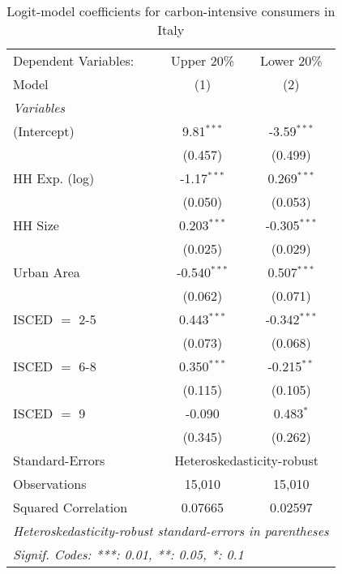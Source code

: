 
\begin{table}[htbp!]
   \centering
   \small
   \begin{adjustbox}{width = 1\textwidth, max height = 0.95\textheight, center}
      \begin{threeparttable}[b]
         \caption{\label{tab:Logit_1_ITA} Logit-model coefficients for carbon-intensive consumers in Italy}
         \begin{tabular}{lcc}
            \tabularnewline \midrule \midrule
            Dependent Variables: & Upper 20\%     & Lower 20\%\\   
            Model                & (1)            & (2)\\  
            \midrule
            \emph{Variables}\\
            (Intercept)          & 9.81$^{***}$   & -3.59$^{***}$\\   
                                 & (0.457)        & (0.499)\\   
            HH Exp. (log)        & -1.17$^{***}$  & 0.269$^{***}$\\   
                                 & (0.050)        & (0.053)\\   
            HH Size              & 0.203$^{***}$  & -0.305$^{***}$\\   
                                 & (0.025)        & (0.029)\\   
            Urban Area           & -0.540$^{***}$ & 0.507$^{***}$\\   
                                 & (0.062)        & (0.071)\\   
            ISCED $=$ 2-5        & 0.443$^{***}$  & -0.342$^{***}$\\   
                                 & (0.073)        & (0.068)\\   
            ISCED $=$ 6-8        & 0.350$^{***}$  & -0.215$^{**}$\\   
                                 & (0.115)        & (0.105)\\   
            ISCED $=$ 9          & -0.090         & 0.483$^{*}$\\   
                                 & (0.345)        & (0.262)\\   
            \midrule 
            Standard-Errors & \multicolumn{2}{c}{Heteroskedasticity-robust} \\ 
            Observations         & 15,010         & 15,010\\  
            Squared Correlation  & 0.07665        & 0.02597\\  
            \midrule \midrule
            \multicolumn{3}{l}{\emph{Heteroskedasticity-robust standard-errors in parentheses}}\\
            \multicolumn{3}{l}{\emph{Signif. Codes: ***: 0.01, **: 0.05, *: 0.1}}\\
         \end{tabular}
         

\end{threeparttable}
\end{adjustbox}
\end{table}
